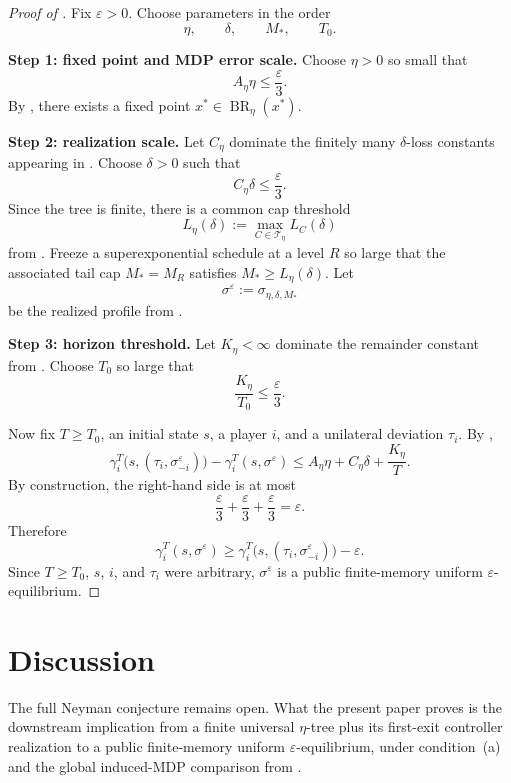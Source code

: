 \documentclass[12pt]{article}
\theoremstyle{definition}
\newcommand{\eps}{\varepsilon}
\newcommand{\1}{\mathbf{1}}
\newcommand{\cT}{\mathcal{T}}
\DeclareMathOperator{\BR}{BR}
\begin{document}
\begin{proof}[Proof of ]
Fix $\eps>0$. Choose parameters in the order
\[
\eta,\qquad \delta,\qquad M_*,\qquad T_0.
\]

\smallskip
\noindent\textbf{Step 1: fixed point and MDP error scale.}
Choose $\eta>0$ so small that
\[
A_\eta\eta\le \frac{\eps}{3}.
\]
By , there exists a fixed point $x^*\in\BR_\eta(x^*)$.

\smallskip
\noindent\textbf{Step 2: realization scale.}
Let $C_\eta$ dominate the finitely many $\delta$-loss constants appearing in
. Choose $\delta>0$ such that
\[
C_\eta\delta\le \frac{\eps}{3}.
\]
Since the tree is finite, there is a common cap threshold
\[
L_\eta(\delta):=\max_{C\in\cT_\eta}L_C(\delta)
\]
from . Freeze a superexponential schedule at a level
$R$ so large that the associated tail cap $M_*=M_R$ satisfies
$M_*\ge L_\eta(\delta)$. Let
\[
\sigma^\eps:=\sigma_{\eta,\delta,M_*}
\]
be the realized profile from .

\smallskip
\noindent\textbf{Step 3: horizon threshold.}
Let $K_\eta<\infty$ dominate the remainder constant from
. Choose $T_0$ so large that
\[
\frac{K_\eta}{T_0}\le \frac{\eps}{3}.
\]

Now fix $T\ge T_0$, an initial state $s$, a player $i$, and a unilateral
deviation $\tau_i$. By ,
\begin{equation}
\label{eq:global-mdp-comparison-proof}
\gamma_i^T\bigl(s,(\tau_i,\sigma^\eps_{-i})\bigr)
-
\gamma_i^T(s,\sigma^\eps)
\le
A_\eta\eta + C_\eta\delta + \frac{K_\eta}{T}.
\end{equation}
By construction, the right-hand side is at most
\[
\frac{\eps}{3}+\frac{\eps}{3}+\frac{\eps}{3}=\eps.
\]
Therefore
\[
\gamma_i^T(s,\sigma^\eps)
\ge
\gamma_i^T\bigl(s,(\tau_i,\sigma^\eps_{-i})\bigr)-\eps.
\]
Since $T\ge T_0$, $s$, $i$, and $\tau_i$ were arbitrary, $\sigma^\eps$ is a
public finite-memory uniform $\eps$-equilibrium.
\end{proof}



\section{Discussion}

The full Neyman conjecture remains open. What the present paper proves is the
downstream implication from a finite universal $\eta$-tree plus its first-exit
controller realization to a public finite-memory uniform $\eps$-equilibrium,
under condition~\textnormal{(a)} and the global induced-MDP comparison from
.
\end{document}
